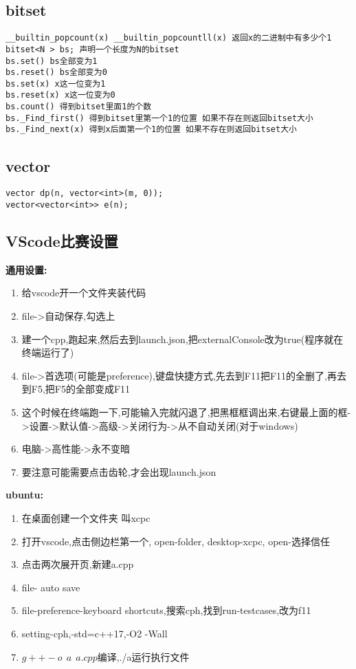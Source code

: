 \documentclass[a4paper, fontset=none]{ctexart}
\begin{document}
\subsection{bitset}

\begin{verbatim}
__builtin_popcount(x) __builtin_popcountll(x) 返回x的二进制中有多少个1
bitset<N > bs; 声明一个长度为N的bitset
bs.set() bs全部变为1
bs.reset() bs全部变为0
bs.set(x) x这一位变为1
bs.reset(x) x这一位变为0
bs.count() 得到bitset里面1的个数
bs._Find_first() 得到bitset里第一个1的位置 如果不存在则返回bitset大小
bs._Find_next(x) 得到x后面第一个1的位置 如果不存在则返回bitset大小
\end{verbatim}
\subsection{vector}

\begin{verbatim}
vector dp(n, vector<int>(m, 0));
vector<vector<int>> e(n);
\end{verbatim}
\subsection{VScode比赛设置}

\textbf{通用设置:}
\begin{enumerate}
\item 给vscode开一个文件夹装代码
\item file->自动保存,勾选上
\item 建一个cpp,跑起来,然后去到launch.json,把externalConsole改为true(程序就在终端运行了)
\item file->首选项(可能是preference),键盘快捷方式,先去到F11把F11的全删了,再去到F5,把F5的全部变成F11
\item 这个时候在终端跑一下,可能输入完就闪退了,把黑框框调出来,右键最上面的框->设置->默认值->高级->关闭行为->从不自动关闭(对于windows)
\item 电脑->高性能->永不变暗
\item 要注意可能需要点击齿轮,才会出现launch.json
\end{enumerate}

\textbf{ubuntu:}
\begin{enumerate}
\item 在桌面创建一个文件夹 叫xcpc
\item 打开vscode,点击侧边栏第一个, open-folder, desktop-xcpc, open-选择信任
\item 点击两次展开页,新建a.cpp
\item file- auto save
\item file-preference-keyboard shortcuts,搜索cph,找到run-testcases,改为f11
\item setting-cph,-std=c++17,-O2 -Wall
\item ${g++ -o \ \ a \ \ a.cpp }$编译,./a运行执行文件
\end{enumerate}
\end{document}
